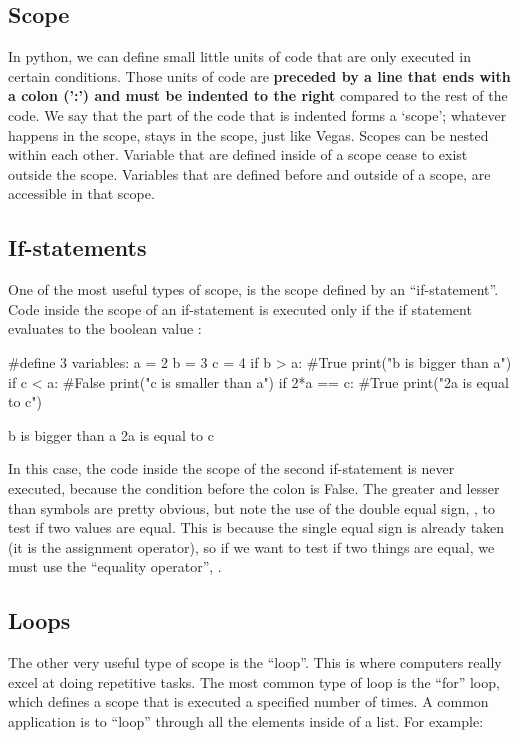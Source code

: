 \subsection{Scope}
In python, we can define small little units of code that are only executed in certain conditions. Those units of code are \textbf{preceded by a line that ends with a colon (':') and must be indented to the right} compared to the rest of the code. We say that the part of the code that is indented forms a `scope';  whatever happens in the scope, stays in the scope, just like Vegas. Scopes can be nested within each other. Variable that are defined inside of a scope cease to exist outside the scope. Variables that are defined before and outside of a scope, are accessible in that scope. 

\subsection{If-statements}
One of the most useful types of scope, is the scope defined by an ``if-statement''. Code inside the scope of an if-statement is executed only if the if statement evaluates to the boolean value :
\begin{python}[caption = \mbox{}]
#define 3 variables:
a = 2 
b = 3
c = 4
if b > a: #True
  print("b is bigger than a")
if c < a: #False
  print("c is smaller than a")
if 2*a == c: #True
  print("2a is equal to c")
\end{python}
\begin{poutput}
b is bigger than a
2a is equal to c
\end{poutput}
In this case, the code inside the scope of the second if-statement is never executed, because the condition before the colon is False. The greater and lesser than symbols are pretty obvious, but note the use of the double equal sign, \code{==}, to test if two values are equal. This is because the single equal sign is already taken (it is the assignment operator), so if we want to test if two things are equal, we must use the ``equality operator'', \code{==}.

\subsection{Loops}
The other very useful type of scope is the ``loop''. This is where computers really excel at doing repetitive tasks. The most common type of loop is the ``for'' loop, which defines a scope that is executed a specified number of times. A common application is to ``loop'' through all the elements inside of a list. For example:


